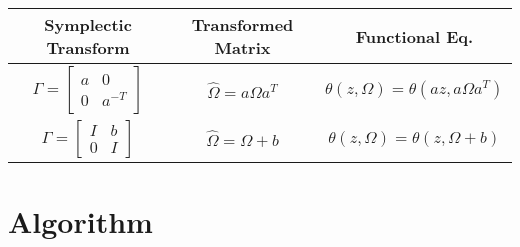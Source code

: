 \documentclass{amsart}
\begin{document}
\begin{table}[h]
\label{tbl: transformations}

\centering
\begin{tabular}{ccc}
  Symplectic Transform & Transformed Matrix & Functional Eq. \\ \hline
  $\Gamma = \left[ \begin{smallmatrix} a & 0 \\ 0 &
      a^{-T} \end{smallmatrix} \right]$ & $\hat{\Omega} = a \Omega
  a^T$ & $\theta(z,\Omega) = \theta(az,a\Omega a^T)$ \\ $\Gamma =
  \left[ \begin{smallmatrix} I & b \\ 0 & I \end{smallmatrix} \right]$
  & $\hat{\Omega} = \Omega + b$ & $\theta(z,\Omega) = \theta(z, \Omega
  + b)$
\end{tabular}
\end{table}



\section{Algorithm}
\end{document}
